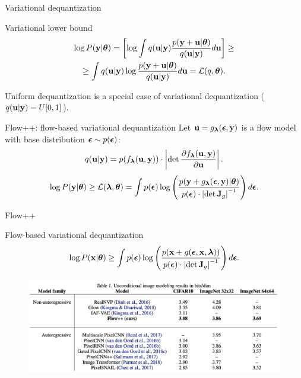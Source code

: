 \begin{frame}{Variational dequantization}
	\vspace{-0.2cm}
	\begin{block}{Variational lower bound}
		\vspace{-0.7cm}
		\begin{multline*}
			\log P(\mathbf{y} | \boldsymbol{\theta}) = \left[ \log \int q(\mathbf{u} | \mathbf{y}) \frac{p(\mathbf{y} + \mathbf{u} | \boldsymbol{\theta})}{q(\mathbf{u} | \mathbf{y})} d \mathbf{u} \right] \geq \\ 
			\geq  \int q(\mathbf{u} | \mathbf{y}) \log \frac{p(\mathbf{y} + \mathbf{u} | \boldsymbol{\theta})}{q(\mathbf{u} | \mathbf{y})} d \mathbf{u} = \mathcal{L}(q, \boldsymbol{\theta}).
		\end{multline*}
		\vspace{-0.6cm}
	\end{block}
	Uniform dequantization is a special case of variational dequantization ($q(\mathbf{u} | \mathbf{y}) = U[0, 1]$).
	\begin{block}{Flow++: flow-based variational dequantization}
		Let $\mathbf{u} = g_{\boldsymbol{\lambda}}(\boldsymbol{\epsilon}, \mathbf{y})$ is a flow model with base distribution $\boldsymbol{\epsilon} \sim p(\boldsymbol{\epsilon})$:
		\vspace{-0.3cm}
		\[
		q(\mathbf{u} | \mathbf{y}) = p(f_{\boldsymbol{\lambda}}(\mathbf{u}, \mathbf{y})) \cdot \left| \det \frac{\partial f_{\boldsymbol{\lambda}}(\mathbf{u}, \mathbf{y})}{\partial \mathbf{u}}\right|.
		\]
		\vspace{-0.3cm}
		\[
		\log P(\mathbf{y} | \boldsymbol{\theta}) \geq \mathcal{L}(\boldsymbol{\lambda}, \boldsymbol{\theta}) = \int p(\boldsymbol{\epsilon}) \log \left( \frac{p(\mathbf{y} + g_{\boldsymbol{\lambda}}(\boldsymbol{\epsilon}, \mathbf{y}) | \boldsymbol{\theta})}{p(\boldsymbol{\epsilon}) \cdot \left| \det \mathbf{J}_g\right|^{-1}} \right) d\boldsymbol{\epsilon}.
		\]
		\vspace{-0.3cm}
	\end{block}
\end{frame}
\begin{frame}{Flow++}
	\begin{block}{Flow-based variational dequantization}
		\vspace{-0.3cm}
		\[
		\log P(\mathbf{x} | \boldsymbol{\theta}) \geq \int p(\boldsymbol{\epsilon})\log \left( \frac{p(\mathbf{x} + g(\boldsymbol{\epsilon}, \mathbf{x}, \boldsymbol{\lambda}))}{p(\boldsymbol{\epsilon}) \cdot \left| \det \mathbf{J}_g\right|^{-1}} \right) d\boldsymbol{\epsilon}.
		\]
	\end{block}
	\begin{figure}
		\centering
		\includegraphics[width=\linewidth]{figs/flow++1.png}
	\end{figure}
	\vspace{-0.1cm}
\end{frame}
